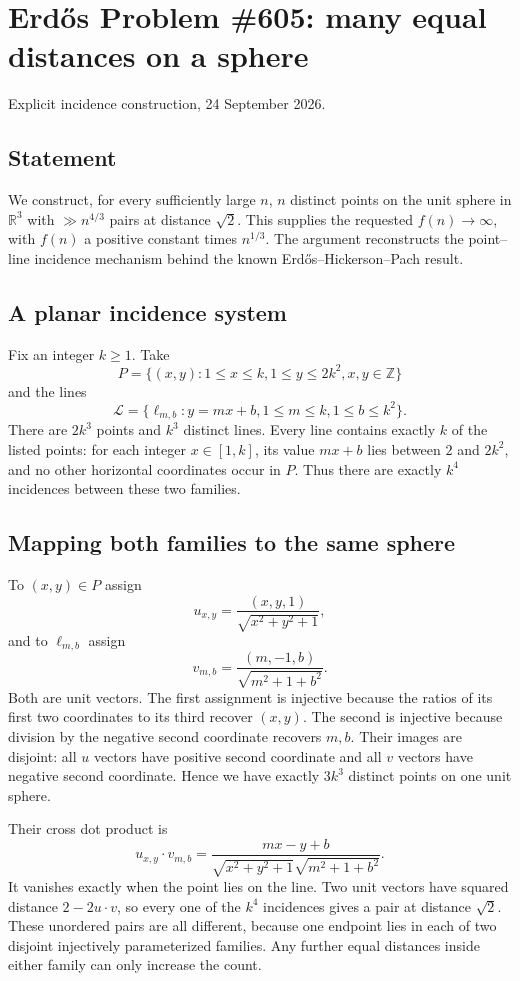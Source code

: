 \section{Erd\H{o}s Problem \#605: many equal distances on a sphere}
\noindent Explicit incidence construction, 24 September 2026.

\subsection*{Statement}
We construct, for every sufficiently large $n$, $n$ distinct points on the unit sphere in $\mathbb R^3$ with $\gg n^{4/3}$ pairs at distance $\sqrt2$. This supplies the requested $f(n)\to\infty$, with $f(n)$ a positive constant times $n^{1/3}$. The argument reconstructs the point--line incidence mechanism behind the known Erd\H{o}s--Hickerson--Pach result.

\subsection*{A planar incidence system}
Fix an integer $k\geq1$. Take
\[P=\{(x,y):1\leq x\leq k, 1\leq y\leq2k^2, x,y\in\mathbb Z\}
\]
and the lines
\[\mathcal L=\{\ell_{m,b}:y=mx+b, 1\leq m\leq k, 1\leq b\leq k^2\}.
\]
There are $2k^3$ points and $k^3$ distinct lines. Every line contains exactly $k$ of the listed points: for each integer $x\in[1,k]$, its value $mx+b$ lies between $2$ and $2k^2$, and no other horizontal coordinates occur in $P$. Thus there are exactly $k^4$ incidences between these two families.

\subsection*{Mapping both families to the same sphere}
To $(x,y)\in P$ assign
\[u_{x,y}=\frac{(x,y,1)}{\sqrt{x^2+y^2+1}},
\]
and to $\ell_{m,b}$ assign
\[v_{m,b}=\frac{(m,-1,b)}{\sqrt{m^2+1+b^2}}.
\]
Both are unit vectors. The first assignment is injective because the ratios of its first two coordinates to its third recover $(x,y)$. The second is injective because division by the negative second coordinate recovers $m,b$. Their images are disjoint: all $u$ vectors have positive second coordinate and all $v$ vectors have negative second coordinate. Hence we have exactly $3k^3$ distinct points on one unit sphere.

Their cross dot product is
\[u_{x,y}\cdot v_{m,b}
=\frac{mx-y+b}{\sqrt{x^2+y^2+1}\sqrt{m^2+1+b^2}}.
\]
It vanishes exactly when the point lies on the line. Two unit vectors have squared distance $2-2u\cdot v$, so every one of the $k^4$ incidences gives a pair at distance $\sqrt2$. These unordered pairs are all different, because one endpoint lies in each of two disjoint injectively parameterized families. Any further equal distances inside either family can only increase the count.


